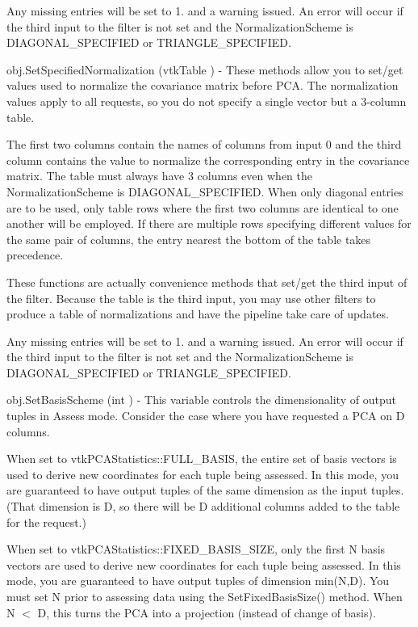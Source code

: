 \begin{DoxyItemize}
Any missing entries will be set to 1. and a warning issued. An error will occur if the third input to the filter is not set and the Normalization\-Scheme is D\-I\-A\-G\-O\-N\-A\-L\-\_\-\-S\-P\-E\-C\-I\-F\-I\-E\-D or T\-R\-I\-A\-N\-G\-L\-E\-\_\-\-S\-P\-E\-C\-I\-F\-I\-E\-D.  
\item {\ttfamily obj.\-Set\-Specified\-Normalization (vtk\-Table )} -\/ These methods allow you to set/get values used to normalize the covariance matrix before P\-C\-A. The normalization values apply to all requests, so you do not specify a single vector but a 3-\/column table.

The first two columns contain the names of columns from input 0 and the third column contains the value to normalize the corresponding entry in the covariance matrix. The table must always have 3 columns even when the Normalization\-Scheme is D\-I\-A\-G\-O\-N\-A\-L\-\_\-\-S\-P\-E\-C\-I\-F\-I\-E\-D. When only diagonal entries are to be used, only table rows where the first two columns are identical to one another will be employed. If there are multiple rows specifying different values for the same pair of columns, the entry nearest the bottom of the table takes precedence.

These functions are actually convenience methods that set/get the third input of the filter. Because the table is the third input, you may use other filters to produce a table of normalizations and have the pipeline take care of updates.

Any missing entries will be set to 1. and a warning issued. An error will occur if the third input to the filter is not set and the Normalization\-Scheme is D\-I\-A\-G\-O\-N\-A\-L\-\_\-\-S\-P\-E\-C\-I\-F\-I\-E\-D or T\-R\-I\-A\-N\-G\-L\-E\-\_\-\-S\-P\-E\-C\-I\-F\-I\-E\-D.  
\item {\ttfamily obj.\-Set\-Basis\-Scheme (int )} -\/ This variable controls the dimensionality of output tuples in Assess mode. Consider the case where you have requested a P\-C\-A on D columns.

When set to vtk\-P\-C\-A\-Statistics\-::\-F\-U\-L\-L\-\_\-\-B\-A\-S\-I\-S, the entire set of basis vectors is used to derive new coordinates for each tuple being assessed. In this mode, you are guaranteed to have output tuples of the same dimension as the input tuples. (That dimension is D, so there will be D additional columns added to the table for the request.)

When set to vtk\-P\-C\-A\-Statistics\-::\-F\-I\-X\-E\-D\-\_\-\-B\-A\-S\-I\-S\-\_\-\-S\-I\-Z\-E, only the first N basis vectors are used to derive new coordinates for each tuple being assessed. In this mode, you are guaranteed to have output tuples of dimension min(\-N,\-D). You must set N prior to assessing data using the Set\-Fixed\-Basis\-Size() method. When N $<$ D, this turns the P\-C\-A into a projection (instead of change of basis).


\end{DoxyItemize}
